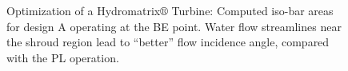 \begin{figure}[h!]
\begin{minipage}[b]{1\linewidth}
 \centering
\end{minipage}
\caption{Optimization of a Hydromatrix$\circledR$ Turbine: Computed iso-bar areas for design A operating at the BE point. Water flow streamlines near the shroud region lead to ``better'' flow incidence angle, compared with the PL operation.}
\label{design-BE-M}
\end{figure}


